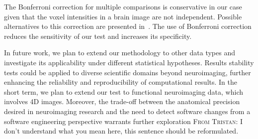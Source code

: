 \documentclass[lettersize,journal]{IEEEtran}
\newcommand{\TG}[1]{\color{orange}\textsc{From Tristan:} #1\color{black}\xspace}
\begin{document}

The Bonferroni correction for multiple comparisons is conservative in our case given that the voxel intensities in a brain image are not independent. 
Possible alternatives to this correction are presented in~\cite{NICHOLS2007246}. The use of Bonferroni correction reduces the sensitivity of our test 
and increases its specificity. 




In future work, we plan to extend our methodology to other data types and investigate its applicability under different statistical hypotheses.
Results stability tests could be applied to diverse scientific domains beyond neuroimaging, further enhancing the reliability and reproducibility of computational results. In the short term, we plan to extend our test to functional neuroimaging data, which involves 4D images. Moreover, the trade-off between the anatomical precision desired in neuroimaging research and the need to detect software changes from a software engineering perspective warrants further exploration \TG{I don't understand what you mean here, this sentence should be reformulated}.
\end{document}

